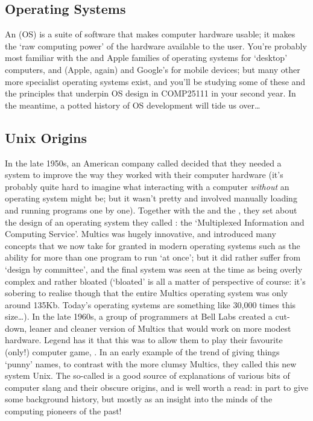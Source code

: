 \subsection{Operating Systems}

An  (OS) is a suite of
software that makes computer hardware usable; it makes the `raw
computing power' of the hardware available to the user. You're
probably most familiar with
the  and
Apple  families of operating systems for
`desktop' computers, and  (Apple, again) and
Google's  for mobile
devices; but many other more specialist operating systems exist, and
you'll be studying some of these and the principles that underpin OS
design in COMP25111 in your second year. In the meantime, a potted
history of OS development will tide us over\ldots

\subsection{Unix Origins}
\label{sec:unix}

In the late 1950s, an American company
called  decided that they
needed a system to improve the way they worked with their computer
hardware (it's probably quite hard to imagine what interacting with a
computer \emph{without} an operating system might be; but it wasn't
pretty and involved manually loading and running programs one by
one). Together with the  and the , they set about the design of an operating system they
called : the `Multiplexed Information and
Computing Service'. Multics was hugely innovative, and introduced many
concepts that we now take for granted in modern operating systems such
as the ability for more than one program to run `at once'; but it did
rather suffer from `design by committee', and the final system was
seen at the time as being overly complex and rather bloated (`bloated'
is all a matter of perspective of course: it's sobering to realise
though that the entire Multics operating system was only around
135Kb. Today's operating systems are something like 30,000 times this
size\ldots). In the late 1960s, a group of programmers at Bell Labs
created a cut-down, leaner and cleaner version of Multics that would
work on more modest hardware. Legend has it that this was to allow
them to play their favourite (only!) computer
game, . In an early
example of the trend of giving things `punny' names, to contrast with
the more clumsy Multics, they called this new system Unix. The
so-called  is a good source of
explanations of various bits of computer slang and their obscure
origins, and is well worth a read: in part to give some background
history, but mostly as an insight into the minds of the computing
pioneers of the past!

